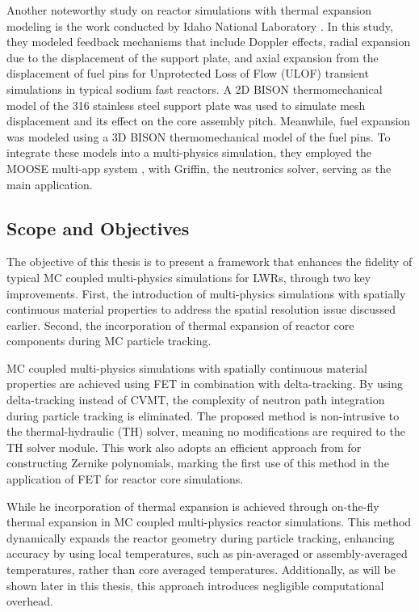 Another noteworthy study on reactor simulations with thermal expansion modeling is the work conducted by Idaho National Laboratory \cite{cole_2021}. In this study, they modeled feedback mechanisms that include Doppler effects, radial expansion due to the displacement of the support plate, and axial expansion from the displacement of fuel pins for Unprotected Loss of Flow (ULOF) transient simulations in typical sodium fast reactors. A 2D BISON thermomechanical model of the 316 stainless steel support plate was used to simulate mesh displacement and its effect on the core assembly pitch. Meanwhile, fuel expansion was modeled using a 3D BISON thermomechanical model of the fuel pins. To integrate these models into a multi-physics simulation, they employed the MOOSE multi-app system \cite{moose_2020}, with Griffin, the neutronics solver, serving as the main application.

\subsection{Scope and Objectives}

The objective of this thesis is to present a framework that enhances the fidelity of typical MC coupled multi-physics simulations for LWRs, through two key improvements. First, the introduction of multi-physics simulations with spatially continuous material properties \cite{imron_2024} to address the spatial resolution issue discussed earlier. Second, the incorporation of thermal expansion of reactor core components during MC particle tracking.

MC coupled multi-physics simulations with spatially continuous material properties are achieved using FET in combination with delta-tracking. By using delta-tracking instead of CVMT, the complexity of neutron path integration during particle tracking is eliminated. The proposed method is non-intrusive to the thermal-hydraulic (TH) solver, meaning no modifications are required to the TH solver module. This work also adopts an efficient approach from \cite{honarvar} for constructing Zernike polynomials, marking the first use of this method in the application of FET for reactor core simulations.

While he incorporation of thermal expansion is achieved through on-the-fly thermal expansion in MC coupled multi-physics reactor simulations. This method dynamically expands the reactor geometry during particle tracking, enhancing accuracy by using local temperatures, such as pin-averaged or assembly-averaged temperatures, rather than core averaged temperatures. Additionally, as will be shown later in this thesis, this approach introduces negligible computational overhead.

